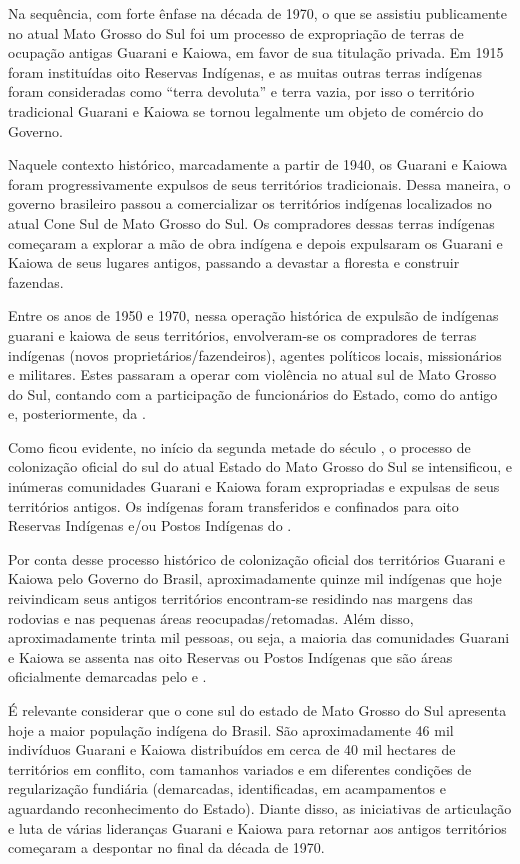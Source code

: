 Na sequência, com forte ênfase na década de 1970, o que se assistiu
publicamente no atual Mato Grosso do Sul foi um processo de
expropriação de terras de ocupação antigas Guarani e Kaiowa, em favor
de sua titulação privada. Em 1915 foram instituídas oito Reservas
Indígenas, e as muitas outras terras indígenas foram consideradas como
``terra devoluta'' e terra vazia, por isso o território tradicional
Guarani e Kaiowa se tornou legalmente um objeto de comércio do Governo.


Naquele contexto histórico, marcadamente a partir de 1940, os Guarani e
Kaiowa foram progressivamente expulsos de seus territórios
tradicionais. Dessa maneira, o governo brasileiro passou a
comercializar os territórios indígenas localizados no atual Cone Sul de
Mato Grosso do Sul. Os compradores dessas terras indígenas começaram a
explorar a mão de obra indígena e depois expulsaram os Guarani e Kaiowa
de seus lugares antigos, passando a devastar a floresta e construir
fazendas.

Entre os anos de 1950 e 1970, nessa operação histórica de expulsão de
indígenas guarani e kaiowa de seus territórios, envolveram-se os
compradores de terras indígenas (novos proprietários/fazendeiros),
agentes políticos locais, missionários e militares. Estes passaram a
operar com violência no atual sul de Mato Grosso do Sul, contando com a
participação de funcionários do Estado, como do antigo  e,
posteriormente, da . 

Como ficou evidente, no início da segunda metade do século , o
processo de colonização oficial do sul do atual Estado do Mato Grosso
do Sul se intensificou, e inúmeras comunidades Guarani e Kaiowa foram
expropriadas e expulsas de seus territórios antigos. Os indígenas foram
transferidos e confinados para oito Reservas Indígenas e/ou Postos
Indígenas do . 

Por conta desse processo histórico de colonização oficial dos
territórios Guarani e Kaiowa pelo Governo do Brasil, aproximadamente
quinze mil indígenas que hoje reivindicam seus antigos territórios
encontram-se residindo nas margens das rodovias e nas pequenas áreas
reocupadas/retomadas. Além disso, aproximadamente trinta mil pessoas,
ou seja, a maioria das comunidades Guarani e Kaiowa se assenta nas oito
Reservas ou Postos Indígenas que são áreas oficialmente demarcadas pelo
 e . 

É relevante considerar que o cone sul do estado de Mato Grosso do Sul
apresenta hoje a maior população indígena do Brasil. São
aproximadamente 46 mil indivíduos Guarani e Kaiowa distribuídos em
cerca de 40 mil hectares de territórios em conflito, com tamanhos
variados e em diferentes condições de regularização fundiária
(demarcadas, identificadas, em acampamentos e aguardando reconhecimento
do Estado). Diante disso, as iniciativas de articulação e luta de
várias lideranças Guarani e Kaiowa para retornar aos antigos
territórios começaram a despontar no final da década de 1970.

